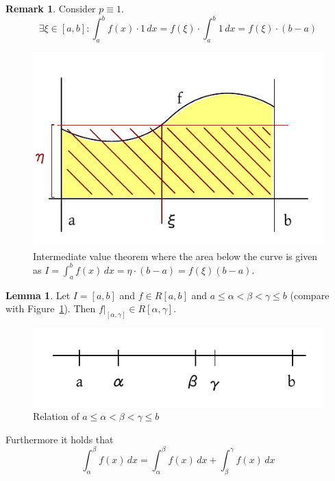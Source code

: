 \documentclass[a4paper,landscape,twocolumn]{article}
\theoremstyle{definition}
\newtheorem{rem}{Remark}
\newtheorem{lemma}{Lemma}
\begin{document}
\begin{rem}
  Consider $p \equiv 1$.
  \[ \exists \xi \in [a,b]: \int_a^b f(x) \cdot 1 \, dx = f(\xi) \cdot \int_a^b 1 \, dx = f(\xi) \cdot (b-a) \]
  \begin{figure}[!h]
    \begin{center}
      \includegraphics{img/intermediate_value_theorem.pdf}
      \caption{Intermediate value theorem where the area below the curve is given as $I = \int_a^b f(x)\, dx = \eta \cdot (b - a) = f(\xi) (b - a)$.}
    \end{center}
  \end{figure}
\end{rem}

\begin{lemma}
  Let $I = [a,b]$ and $f \in R[a,b]$ and $a \leq \alpha < \beta < \gamma \leq b$ (compare with Figure~\ref{img:nl}).
  Then $f |_{[\alpha,\gamma]} \in R[\alpha,\gamma]$.

  \begin{figure}[!h]
    \begin{center}
      \includegraphics{img/number_line.pdf}
      \caption{Relation of $a \leq \alpha < \beta < \gamma \leq b$}
      \label{img:nl}
    \end{center}
  \end{figure}

  Furthermore it holds that
  \[ \int_{\alpha}^\beta f(x) \, dx = \int_\alpha^\beta f(x) \, dx + \int_\beta^\gamma f(x) \, dx \]
\end{lemma}
\end{document}
